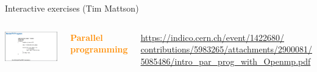 \documentclass[aspectratio=169]{beamer}
\begin{document}
\begin{frame}{Interactive exercises (Tim Mattson)}
\vspace{0.25 cm}
\large
\begin{columns}
\includegraphics[width=\linewidth]{PLOTS/parallel-processing.png}

\textcolor{darkorange}{\bf Parallel programming}

\tiny
\vspace{0.2 cm}
\textcolor{blue}{\href{https://indico.cern.ch/event/1422680/contributions/5983265/attachments/2900081/5085486/intro_par_prog_with_Openmp.pdf}{https://indico.cern.ch/event/1422680/ \\
%
contributions/5983265/attachments/2900081/
%
5085486/intro\_par\_prog\_with\_Openmp.pdf}}

\small
\vspace{0.25 cm}

\vspace{0.25 cm}

\vspace{0.25 cm}

\end{columns}
\end{frame}
\end{document}

